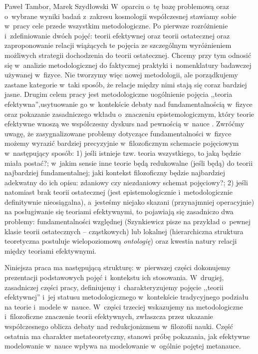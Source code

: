 \begin{artplenv}{Paweł Tambor, Marek Szydłowski}
W~oparciu o~tę bazę problemową oraz o~wybrane wyniki badań z~zakresu kosmologii współczesnej stawiamy sobie w~pracy cele przede wszystkim metodologiczne. Po pierwsze rozróżnienie i~zdefiniowanie dwóch pojęć: teorii efektywnej oraz teorii ostatecznej oraz zaproponowanie relacji wiążących te pojęcia ze szczególnym wyróżnieniem możliwych strategii dochodzenia do teorii ostatecznej. Chcemy przy tym odnosić się w~analizie metodologicznej do faktycznej praktyki i~nomenklatury badawczej używanej w~fizyce. Nie tworzymy więc nowej metodologii, ale porządkujemy zastane kategorie w~taki sposób, że relacje między nimi stają się coraz bardziej jasne. Drugim celem pracy jest metodologiczne uogólnienie pojęcia ,,teoria efektywna'',usytuowanie go w~kontekście debaty nad fundamentalnością w~fizyce oraz pokazanie zasadniczego wkładu o~znaczeniu epistemologicznym, który teorie efektywne wnoszą we współczesny dyskurs nad pewnością w~nauce
\parencite[][]{szydlowski_model_2008}. %
 Zwróćmy uwagę, że zasygnalizowane problemy dotyczące fundamentalności w~fizyce możemy wyrazić bardziej precyzyjnie w~filozoficznym schemacie pojęciowym w~następujący sposób: 1) jeśli istnieje tzw. teoria wszystkiego, to jaką będzie miała postać?; w~jakim sensie inne teorie będą redukowalne (jeśli będą) do teorii najbardziej fundamentalnej; jaki kontekst filozoficzny będzie najbardziej adekwatny do ich opisu: zdaniowy czy niezdaniowy schemat pojęciowy?; 2) jeśli natomiast brak teorii ostatecznej (jest epistemologicznie i~metodologicznie definitywnie nieosiągalna), a~jesteśmy niejako skazani (przynajmniej operacyjnie) na posługiwanie się teoriami efektywnymi, to pojawiają się zasadniczo dwa problemy: fundamentalności względnej (Szynkiewicz pisze na przykład o~pewnej klasie teorii ostatecznych -- cząstkowych) lub lokalnej (hierarchiczna struktura teoretyczna postuluje wielopoziomową \textit{ontologię}) oraz kwestia natury relacji między teoriami efektywnymi.

Niniejsza praca ma następującą strukturę: w~pierwszej części dokonujemy prezentacji podstawowych pojęć i~kontekstu ich stosowania. W~drugiej, zasadniczej części pracy, definiujemy i~charakteryzujemy pojęcie ,,teorii efektywnej'' i~jej statusu metodologicznego w~kontekście tradycyjnego podziału na teorie i~modele w~nauce. W~części trzeciej wskazujemy na metodologiczne i~filozoficzne znaczenie teorii efektywnych, zwłaszcza przez ukazanie współczesnego oblicza debaty nad redukcjonizmem w~filozofii nauki. Część ostatnia ma charakter metateoretyczny, stanowi próbę pokazania, jak efektywne modelowanie w~nauce wpływa na modelowanie w~ogólnie pojętej metanauce.


\end{artplenv}
